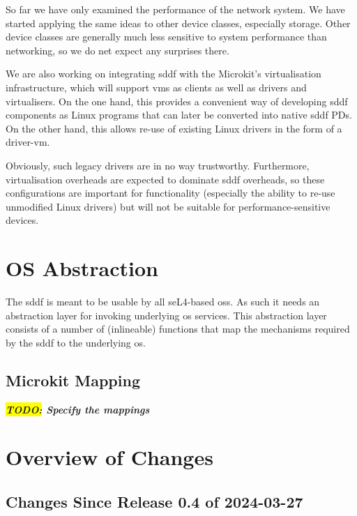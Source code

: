 \documentclass[a4paper,12pt]{report}
\newcommand{\TODO}[1]{\textbf{\textsl{\colorbox{yellow}{TODO:} #1}}}
\newcommand{\TODO}[1]{\relax}
\begin{document}
So far we have only examined the performance of the network system. We
have started applying the same ideas to other device classes,
especially storage. Other device classes are generally much less
sensitive to system performance than networking, so we do net expect
any surprises there.

We are also working on integrating \gls{sddf} with the Microkit's
virtualisation infrastructure, which will support \glspl{vm} as clients as
well as drivers and virtualisers. On the one hand, this provides a
convenient way of developing \gls{sddf} components as Linux programs that
can later be converted into native \gls{sddf} PDs. On the other hand, this
allows re-use of existing Linux drivers in the form of a driver-\gls{vm}.

Obviously, such legacy drivers are in no way trustworthy. Furthermore,
virtualisation overheads are expected to dominate
\gls{sddf} overheads, so these configurations are important for
functionality (especially the ability to re-use unmodified Linux
drivers) but will not be suitable for performance-sensitive
devices.




\appendix

\chapter{OS Abstraction}\label{s:osal}

The \gls{sddf} is meant to be usable by all seL4-based \glspl{os}. As
such it needs an abstraction layer for invoking underlying \gls{os}
services. This abstraction layer consists of a number of (inlineable)
functions that map the mechanisms required by the \gls{sddf} to the
underlying \gls{os}.

\section{Microkit Mapping}\label{s:mkal}

\TODO{Specify the mappings}

\chapter{Overview of Changes}

\section{Changes Since Release 0.4 of 2024-03-27}
\end{document}
